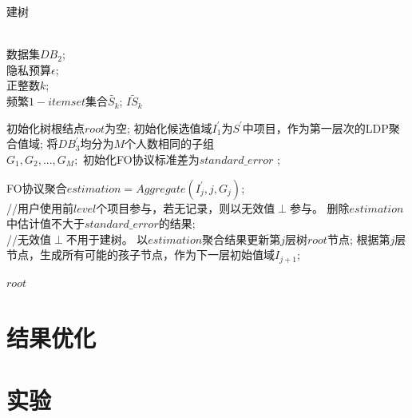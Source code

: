 \documentclass[UTF8]{ctexart}
\begin{document}
\begin{algorithm}[htbp]
\caption{建树}
\label{alg:bulid tree}
\begin{algorithmic}[1]
\REQUIRE ~~\\
数据集$DB_2$;\\
隐私预算$\epsilon$;\\
正整数$k$;\\
频繁$1-itemset$集合$\tilde{S_k}$;
\ENSURE $\tilde{IS_k}$

\STATE 初始化树根结点$root$为空;
\STATE 初始化候选值域$I^{\prime}_{1}$为$S^{\prime}$中项目，作为第一层次的LDP聚合值域;
\STATE 将$D B^{\prime}_{3}$均分为$M$个人数相同的子组~~\\
$G_{1},G_{2},...,G_{M};$
\STATE 初始化FO协议标准差为$standard\_error$ ;

    \STATE FO协议聚合$estimation = Aggregate(I^{\prime}_{j},j,G_{j})$;\\
    //用户使用前$level$个项目参与，若无记录，则以无效值$\perp$参与。
    \STATE 删除$estimation$中估计值不大于$standard\_error$的结果;\\
    //无效值$\perp$不用于建树。
    \STATE 以$estimation$聚合结果更新第$j$层树$root$节点;
    \STATE 根据第$j$层节点，生成所有可能的孩子节点，作为下一层初始值域$I_{j+1}$;
\ENDFOR

\RETURN $root$
\end{algorithmic}
\end{algorithm}

\section{结果优化}
\label{section:optimize}

\section{实验}
\end{document}
